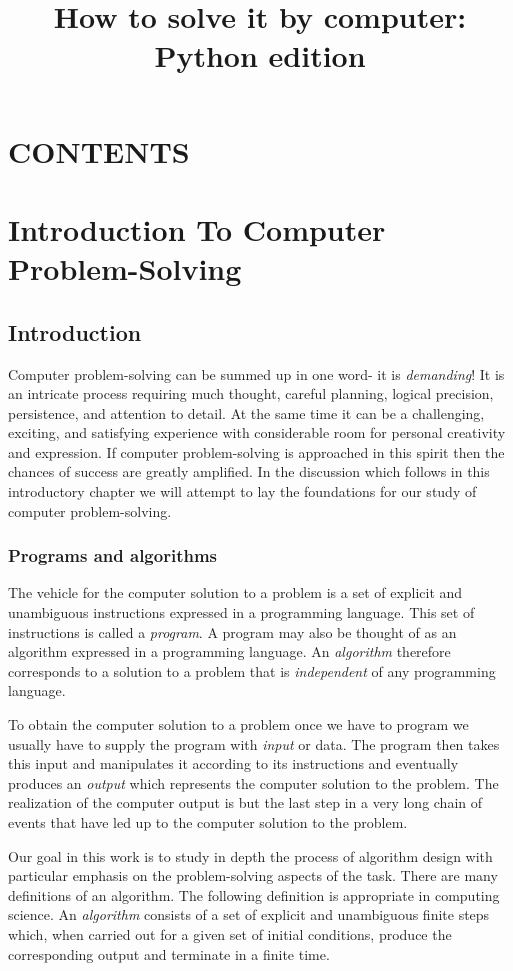 \documentclass{book}
\begin{document}
\title{How to solve it by computer: Python edition}
\maketitle


\chapter*{CONTENTS}
\chapter{Introduction To Computer Problem-Solving}
\section{Introduction}
Computer problem-solving can be summed up in one word- it is \textit{demanding}! It is an intricate process requiring much thought, careful planning, logical precision, persistence, and attention to detail. At the same time it can be a challenging, exciting, and satisfying experience with considerable room for personal creativity and expression. If computer problem-solving is approached in this spirit then the chances of success are greatly amplified. In the discussion which follows in this introductory chapter we will attempt to lay the foundations for our study of computer problem-solving.
\subsection{Programs and algorithms}
The vehicle for the computer solution to a problem is a set of explicit and unambiguous instructions expressed in a programming language. This set of instructions is called a \textit{program}. A program may also be thought of as an algorithm expressed in a programming language. An \textit{algorithm} therefore corresponds to a solution to a problem that is \textit{independent} of any programming language.\par
	To obtain the computer solution to a problem once we have to program we usually have to supply the program with \textit{input} or data. The program then takes this input and manipulates it according to its instructions and eventually produces an \textit{output} which represents the computer solution to the problem. The realization of the computer output is but the last step in a very long chain of events that have led up to the computer solution to the problem.\par
	Our goal in this work is to study in depth the process of algorithm design with particular emphasis on the problem-solving aspects of the task. There are many definitions of an algorithm. The following definition is appropriate in computing science. An \textit{algorithm} consists of a set of explicit and unambiguous finite steps which, when carried out for a given set of initial conditions, produce the corresponding output and terminate in a finite time.
\end{document}
